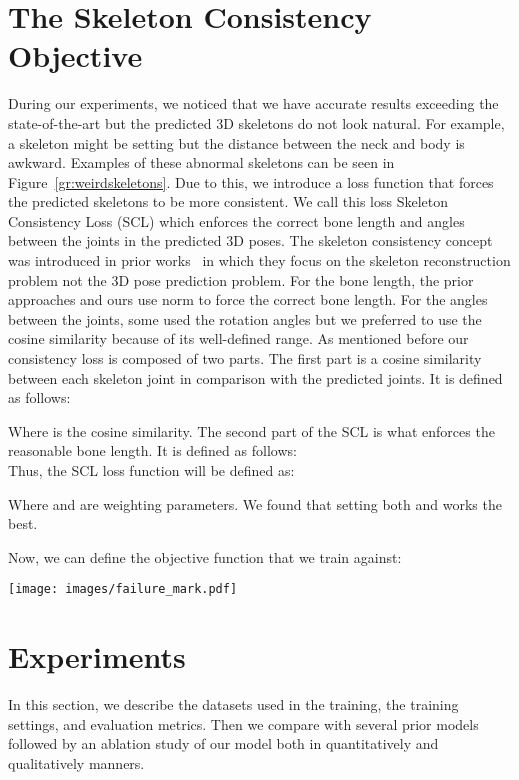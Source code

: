 \documentclass[10pt,twocolumn,letterpaper]{article}
\begin{document}
\section{The Skeleton Consistency Objective}
During our experiments, we noticed that we have accurate results exceeding the state-of-the-art but the predicted 3D skeletons do not look natural. For example, a skeleton might be setting but the distance between the neck and body is awkward. Examples of these abnormal skeletons can be seen in Figure~\ref{gr:weirdskeletons}. Due to this, we introduce a loss function that forces the predicted skeletons to be more consistent. We call this loss Skeleton Consistency Loss (SCL) which enforces the correct bone length and angles between the joints in the predicted 3D poses. The skeleton consistency concept was introduced in prior works~\cite{brau20163d, dabral2018learning, ramakrishna2012reconstructing, bkak2016recent,shi2020motionet} in which they focus on the skeleton reconstruction problem not the 3D pose prediction problem. For the bone length, the prior approaches and ours use  norm to force the correct bone length. For the angles between the joints, some used the rotation angles but we preferred to use the cosine similarity because of its well-defined range. As mentioned before our consistency loss is composed of two parts. The first part is a cosine similarity between each skeleton joint  in comparison with the predicted joints. It is defined as follows: 

Where  is the cosine similarity. The second part of the SCL is what enforces the reasonable bone length. It is defined as follows: \\ 

Thus, the SCL loss function  will be defined as: 

Where  and  are weighting parameters. We found that setting both  and  works the best.
 
Now, we can define the objective function that we train against:

\begin{figure*}[t]
	\centering
\texttt{[image: images/failure\_mark.pdf]}
	\caption{Different cases of deformation of the predicted 3D skeletons. Arrow indicates the time direction. The first two poses (a) and (b) show awkward joint angles between each joint. The case (c) one the right shows failure in both predicted angle and bone length.}
	\label{gr:weirdskeletons}
\end{figure*}

\section{Experiments}
In this section, we describe the datasets used in the training, the training settings, and evaluation metrics. Then we compare with several prior models followed by an ablation study of our model both in quantitatively and qualitatively manners.
\end{document}
